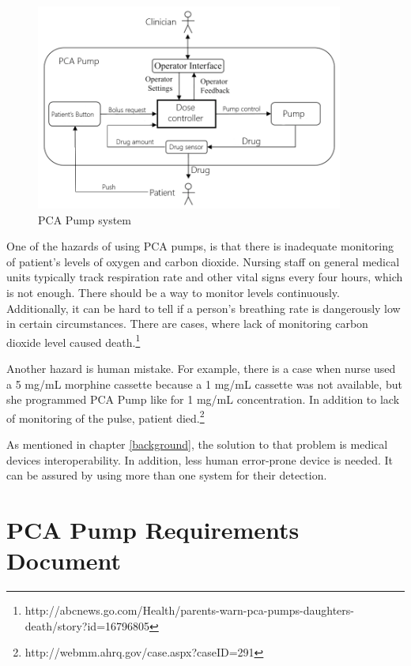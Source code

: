\begin{figure}[ht]%
    \begin{center}
    	\includegraphics[width=0.9\textwidth]{figures/pca-pump-system.png}    	
    \end{center}
    \caption{PCA Pump system}
    \label{figure:pca-pump-system}
\end{figure}

One of the hazards of using PCA pumps, is that there is inadequate monitoring of patient's levels of oxygen and carbon dioxide. Nursing staff on general medical units typically track respiration rate and other vital signs every four hours, which is not enough. There should be a way to monitor levels continuously. Additionally, it can be hard to tell if a person's breathing rate is dangerously low in certain circumstances. There are cases, where lack of monitoring carbon dioxide level caused death.\footnote{http://abcnews.go.com/Health/parents-warn-pca-pumps-daughters-death/story?id=16796805} 

Another hazard is human mistake. For example, there is a case when nurse used a 5 mg/mL morphine cassette because a 1 mg/mL cassette was not available, but she programmed PCA Pump like for 1 mg/mL concentration. In addition to lack of monitoring of the pulse, patient died.\footnote{http://webmm.ahrq.gov/case.aspx?caseID=291}

As mentioned in chapter \ref{background}, the solution to that problem is medical devices interoperability. In addition, less human error-prone device is needed. It can be assured by using more than one system for their detection.



\section{PCA Pump Requirements Document}
\label{pcapump:requirements-doc}

